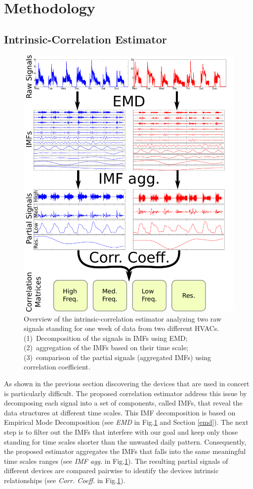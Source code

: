 
\section{Methodology}

\subsection{Intrinsic-Correlation Estimator} \label{methodo:est}

\begin{figure}[t!]
 \includegraphics[width=.5\textwidth]{img/estimator.pdf}
 \caption{Overview of the intrinsic-correlation estimator analyzing two raw signals standing for one week of data from two different HVACs. (1)~Decomposition of the signals in IMFs using EMD; (2)~aggregation of the IMFs based on their time scale; (3)~comparison of the partial signals (aggregated IMFs) using correlation coefficient.}
 \label{fig:diagram1}
\end{figure}

As shown in the previous section discovering the devices that are used in concert is particularly difficult.
The proposed correlation estimator address this issue by decomposing each signal into a set of components, called IMFs, that reveal the data structures at different time scales.
This IMF decomposition is based on Empirical Mode Decomposition (see \emph{EMD} in Fig.\ref{fig:diagram1} and Section \ref{emd}).
The next step is to filter out the IMFs that interfere with our goal and keep only those standing for time scales shorter than the unwanted daily pattern.
Consequently, the proposed estimator aggregates the IMFs that falls into the same meaningful time scales ranges (see \emph{IMF agg.} in Fig.\ref{fig:diagram1}).
The resulting partial signals of different devices are compared pairwise to identify the devices intrinsic relationships (see \emph{Corr. Coeff.} in Fig.\ref{fig:diagram1}). 

